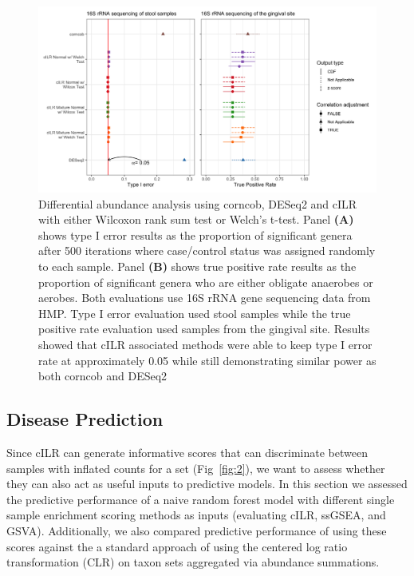 \documentclass[10pt,letterpaper]{article}
\begin{document}
\begin{figure}[!h]
    \centering
    \includegraphics[width = \textwidth]{figures/data_diff_ab.png}
    \caption{Differential abundance analysis using corncob, DESeq2 and cILR with either Wilcoxon rank sum test or Welch's t-test. Panel \textbf{(A)} shows type I error results as the proportion of significant genera after 500 iterations where case/control status was assigned randomly to each sample. Panel \textbf{(B)} shows true positive rate results as the proportion of significant genera who are either obligate anaerobes or aerobes. Both evaluations use 16S rRNA gene sequencing data from HMP. Type I error evaluation used stool samples while the true positive rate evaluation used samples from the gingival site. Results showed that cILR associated methods were able to keep type I error rate at approximately 0.05 while still demonstrating similar power as both corncob and DESeq2} 
    \label{fig:5}
\end{figure}

\subsection*{Disease Prediction}   
Since cILR can generate informative scores that can discriminate between samples with inflated counts for a set (Fig~\ref{fig:2}), we want to assess whether they can also act as useful inputs to predictive models. In this section we assessed the predictive performance of a naive random forest model \cite{breiman2001} with different single sample enrichment scoring methods as inputs (evaluating cILR, ssGSEA, and GSVA). Additionally, we also compared predictive performance of using these scores against the a standard approach of using the centered log ratio transformation (CLR) on taxon sets aggregated via abundance summations.     
\end{document}
